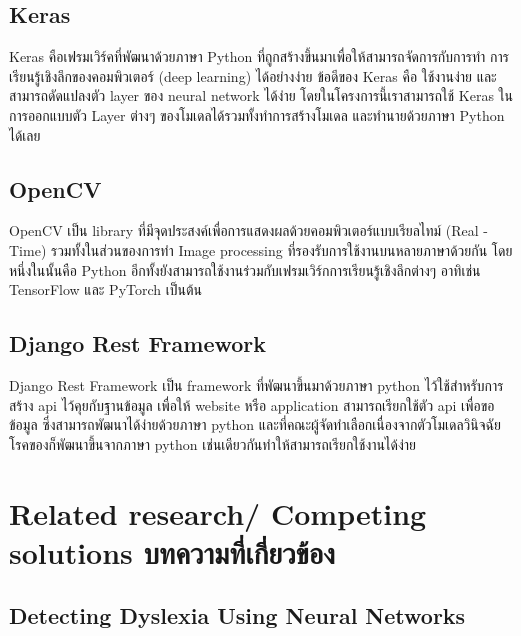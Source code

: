 \documentclass[12pt,oneside,openright,a4paper]{cpe-thai-project}
\begin{document}
\subsection{Keras}
Keras คือเฟรมเวิร์คที่พัฒนาด้วยภาษา Python ที่ถูกสร้างขึ้นมาเพื่อให้สามารถจัดการกับการทำ การเรียนรู้เชิงลึกของคอมพิวเตอร์ (deep learning) 
ได้อย่างง่าย ข้อดีของ Keras คือ ใช้งานง่าย และสามารถดัดแปลงตัว layer ของ neural network ได้ง่าย  โดยในโครงการนี้เราสามารถใช้ Keras 
ในการออกแบบตัว Layer ต่างๆ ของโมเดลได้รวมทั้งทำการสร้างโมเดล และทำนายด้วยภาษา Python ได้เลย

\subsection{OpenCV\cite{OpenCV}}
OpenCV เป็น library ที่มีจุดประสงค์เพื่อการแสดงผลด้วยคอมพิวเตอร์แบบเรียลไทม์  (Real - Time) รวมทั้งในส่วนของการทำ Image processing ที่รองรับการใช้งานบนหลายภาษาด้วยกัน
 โดยหนึ่งในนั้นคือ Python อีกทั้งยังสามารถใช้งานร่วมกับเฟรมเวิร์กการเรียนรู้เชิงลึกต่างๆ อาทิเช่น TensorFlow และ PyTorch  เป็นต้น 

\subsection{Django Rest Framework}
Django Rest Framework เป็น framework ที่พัฒนาขึ้นมาด้วยภาษา python ไว้ใช้สำหรับการสร้าง api ไว้คุยกับฐานข้อมูล  
เพื่อให้ website หรือ application สามารถเรียกใช้ตัว api เพื่อขอข้อมูล  ซึ่งสามารถพัฒนาได้ง่ายด้วยภาษา python
 และที่คณะผู้จัดทำเลือกเนื่องจากตัวโมเดลวินิจฉัยโรคของก็พัฒนาขึ้นจากภาษา python เช่นเดียวกันทำให้สามารถเรียกใช้งานได้ง่าย

\section{Related research/ Competing solutions บทความที่เกี่ยวข้อง}

\subsection{Detecting Dyslexia Using Neural Networks\cite{Dyslexia}}
\begin{figure}[!ht]\centering
  \setlength{\fboxrule}{0.2mm} %
  \setlength{\fboxsep}{1cm}
\end{figure}
\end{document}
